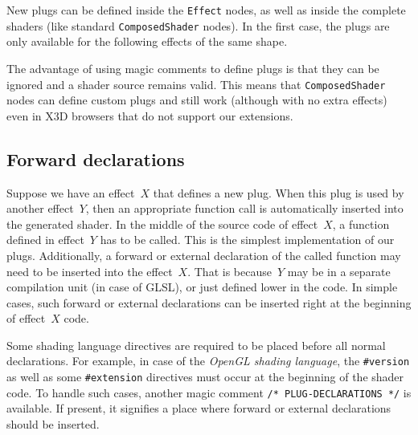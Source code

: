 \documentclass{egpubl}
\begin{document}
New plugs can be defined inside the \texttt{Effect} nodes,
as well as inside the complete shaders (like standard
\texttt{ComposedShader} nodes).
In the first case, the plugs
are only available for the following effects of the same shape.

The advantage of using magic comments to define plugs is that
they can be ignored and a shader source remains valid.
This means that \texttt{ComposedShader} nodes can define custom plugs
and still work (although with no extra effects) even in X3D browsers
that do not support our extensions.

\subsection{Forward declarations}

Suppose we have an effect~$X$ that defines a new plug.
When this plug is used by another effect~$Y$,
then an appropriate function call is automatically inserted into the generated shader.
In the middle of the source code of effect~$X$,
a function defined in effect~$Y$ has to be called. This is the simplest
implementation of our plugs.
Additionally, a forward or external declaration of the called function
may need to be inserted into the effect~$X$. That is because~$Y$
may be in a separate compilation unit (in case of GLSL),
or just defined lower in the code. In simple cases, such forward or external
declarations can be inserted right at the beginning of effect~$X$ code.

Some shading language directives are required to be placed before
all normal declarations. For example, in case of the \emph{OpenGL shading language},
the \texttt{\#version} as well as some \texttt{\#extension} directives
must occur at the beginning of the shader code.
To handle such cases, another magic comment \texttt{/* PLUG-DECLARATIONS */}
is available.
If present, it signifies a place where forward or external declarations
should be inserted.


\end{document}
